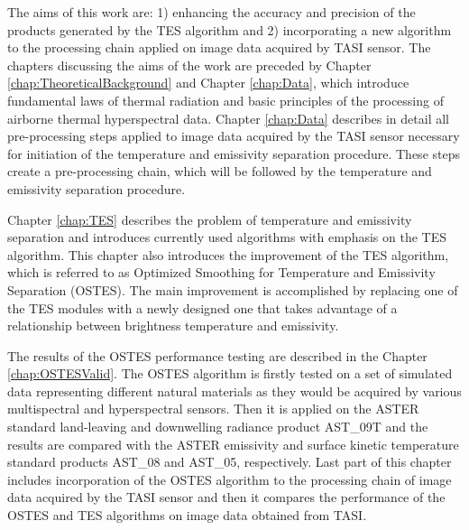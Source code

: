 The aims of this work are: 1) enhancing the accuracy and precision of the products generated by the TES algorithm and 2) incorporating a new algorithm to the processing chain applied on image data acquired by TASI sensor. The chapters discussing the aims of the work are preceded by Chapter \ref{chap:TheoreticalBackground} and Chapter \ref{chap:Data}, which introduce fundamental laws of thermal radiation and basic principles of the processing of airborne thermal hyperspectral data. Chapter \ref{chap:Data} describes in detail all pre-processing steps applied to image data acquired by the TASI sensor necessary for initiation of the temperature and emissivity separation procedure. These steps create a pre-processing chain, which will be followed by the temperature and emissivity separation procedure.

Chapter \ref{chap:TES} describes the problem of temperature and emissivity separation and introduces currently used algorithms with emphasis on the TES algorithm. This chapter also introduces the improvement of the TES algorithm, which is referred to as Optimized Smoothing for Temperature and Emissivity Separation (OSTES). The main improvement is accomplished by replacing one of the TES modules with a newly designed one that takes advantage of a relationship between brightness temperature and emissivity.

The results of the OSTES performance testing are described in the Chapter \ref{chap:OSTESValid}. The OSTES algorithm is firstly tested on a set of simulated data representing different natural materials as they would be acquired by various multispectral and hyperspectral sensors. Then it is applied on the ASTER standard land-leaving and downwelling radiance product AST\_09T and the results are compared with the ASTER emissivity and surface kinetic temperature standard products AST\_08 and AST\_05, respectively. Last part of this chapter includes incorporation of the OSTES algorithm to the processing chain of image data acquired by the TASI sensor and then it compares the performance of the OSTES and TES algorithms on image data obtained from TASI.